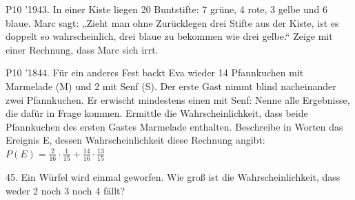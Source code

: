 \documentclass[11pt]{article}
\begin{document}
\pfgruppe{}
\begin{pfaufg}{P10 ’19}{\llap{\textasteriskcentered\,}43.}{}
In einer Kiste liegen 20 Buntstifte: 7 grüne, 4 rote, 3 gelbe und 6 blaue. Marc sagt: „Zieht man ohne Zurücklegen drei Stifte aus der Kiste, ist es doppelt so wahrscheinlich, drei blaue zu bekommen wie drei gelbe.“ Zeige mit einer Rechnung, dass Marc sich irrt.
\end{pfaufg}
\pfgruppe{}
\begin{pfaufg}{P10 ’18}{\llap{\textasteriskcentered\,}44.}{}
Für ein anderes Fest backt Eva wieder 14 Pfannkuchen mit Marmelade (M) und 2 mit Senf (S). Der erste Gast nimmt blind nacheinander zwei Pfannkuchen. Er erwischt mindestens einen mit Senf: Nenne alle Ergebnisse, die dafür in Frage kommen. Ermittle die Wahrscheinlichkeit, dass beide Pfannkuchen des ersten Gastes Marmelade enthalten. Beschreibe in Worten das Ereignis E, dessen Wahrscheinlichkeit diese Rechnung angibt: $P(E) = \tfrac{2}{16}\cdot\tfrac{1}{15} + \tfrac{14}{16}\cdot\tfrac{13}{15}$
\end{pfaufg}
\pfgruppe{}
\begin{pfaufg}{}{45.}{}
Ein Würfel wird einmal geworfen. Wie groß ist die Wahrscheinlichkeit, dass weder 2 noch 3 noch 4 fällt?
\end{pfaufg}
\par\Needspace*{0.55\textheight}
\end{document}
